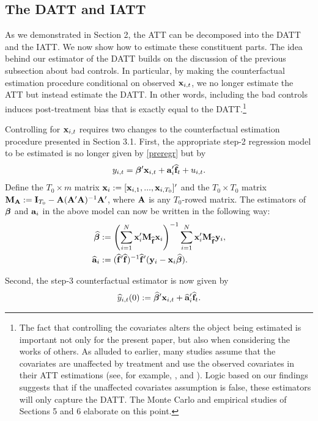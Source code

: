 \documentclass[12pt,fleqn]{article}
\begin{document}
  \subsection{The DATT and IATT}
  
  As we demonstrated in Section 2, the ATT can be decomposed into the DATT and the IATT. We now show how to estimate these constituent parts. The idea behind our estimator of the DATT builds on the discussion of the previous subsection about bad controls. In particular, by making the counterfactual estimation procedure conditional on observed $\mathbf{x}_{i,t}$, we no longer estimate the ATT but instead estimate the DATT. In other words, including the bad controls induces post-treatment bias that is exactly equal to the DATT.\footnote{The fact that controlling the covariates alters the object being estimated is important not only for the present paper, but also when considering the works of others. As alluded to earlier, many studies assume that the covariates are unaffected by treatment and use the observed covariates in their ATT estimations (see, for example, \citealp{chan2022pcdid}, and \citealp{Xu_2017}). Logic based on our findings suggests that if the unaffected covariates assumption is false, these estimators will only capture the DATT. The Monte Carlo and empirical studies of Sections 5 and 6 elaborate on this point.}
  
  Controlling for $\mathbf{x}_{i,t}$ requires two changes to the counterfactual estimation procedure presented in Section 3.1. First, the appropriate step-2 regression model to be estimated is no longer given by \eqref{preregr} but by
  \begin{align}
  y_{i,t} = \boldsymbol{\beta}'\mathbf{x}_{i,t} + \mathbf{a}_i'\widehat{\mathbf{f}}_t + u_{i,t}.
  \end{align}
  Define the $T_0\times m$ matrix $\mathbf{x}_{i} := [\mathbf{x}_{i,1},...,\mathbf{x}_{i,T_0}]'$ and the $T_0\times T_0$ matrix $\mathbf{M}_{\mathbf{A}} := \mathbf{I}_{T_0} - \mathbf{A}(\mathbf{A}'\mathbf{A})^{-1}\mathbf{A}'$, where $\mathbf{A}$ is any $T_0$-rowed matrix. The estimators of $\boldsymbol{\beta}$ and $\mathbf{a}_i$ in the above model can now be written in the following way:
  \begin{align}
  \widehat{\boldsymbol{\beta}} &:= \left(\sum_{i=1}^N  \mathbf{x}_{i}'\mathbf{M}_{\widehat{\mathbf{f}}}\mathbf{x}_{i}\right)^{-1}\sum_{i=1}^N \mathbf{x}_{i}' \mathbf{M}_{\widehat{\mathbf{f}}}\mathbf{y}_{i},\\
  \widehat{\mathbf{a}}_i &:= (\widehat{\mathbf{f}}'\widehat{\mathbf{f}})^{-1}\widehat{\mathbf{f}}'(\mathbf{y}_{i}-\mathbf{x}_{i}\widehat{\boldsymbol{\beta}}).
  \end{align}
  
  Second, the step-3 counterfactual estimator is now given by
  \begin{align}
  \widehat y_{i,t}(0) := \widehat{\boldsymbol{\beta}}'\mathbf{x}_{i,t} +  \widehat{\mathbf{a}}_i'\widehat{\mathbf{f}}_t.
  \end{align}
  
\end{document}
